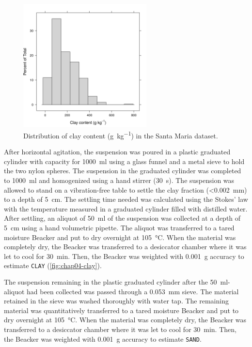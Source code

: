 \begin{figure}[!ht]
\centering
\includegraphics[width=0.60\textwidth]{fig/chap04-clay}
\caption[Distribution of clay content in the Santa Maria dataset.]{Distribution of clay content 
(\si{\gram\per\kilo\gram}) in the Santa Maria dataset.}
\label{fig:chap04-clay}
\end{figure}

After horizontal agitation, the suspension was poured in a plastic graduated cylinder with capacity for 
\SI{1000}{\ml} using a glass funnel and a metal sieve to hold the two nylon spheres. The suspension in the 
graduated cylinder was completed to \SI{1000}{\ml} and homogenized using a hand stirrer (\SI{30}{\second}). 
The suspension was allowed to stand on a vibration-free table to settle the clay fraction (\SI{<0.002}{\mm}) 
to a depth of \SI{5}{\cm}. The settling time needed was calculated using the Stokes’ law with the temperature 
measured in a graduated cylinder filled with distilled water. After settling, an aliquot of \SI{50}{\ml} of 
the suspension was collected at a depth of \SI{5}{\cm} using a hand volumetric pipette. The aliquot was 
transferred to a tared moisture Beacker and put to dry overnight at \SI{105}{\celsius}. When the material was 
completely dry, the Beacker was transferred to a desiccator chamber where it was let to cool for 
\SI{30}{\minute}. Then, the Beacker was weighted with \SI{0.001}{\g} accuracy to estimate \texttt{CLAY} 
(\autoref{fig:chap04-clay}).

The suspension remaining in the plastic graduated cylinder after the \SI{50}{\ml}-aliquot had been collected 
was passed through a \SI{0.053}{\mm} sieve. The material retained in the sieve was washed thoroughly with 
water tap. The remaining material was quantitatively transferred to a tared moisture Beacker and put to dry 
overnight at \SI{105}{\celsius}. When the material was completely dry, the Beacker was transferred to a 
desiccator chamber where it was let to cool for \SI{30}{\minute}. Then, the Beacker was weighted with 
\SI{0.001}{\g} accuracy to estimate \texttt{SAND}.

